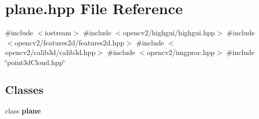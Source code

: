 \section{plane.\+hpp File Reference}
\label{plane_8hpp}
{\ttfamily \#include $<$iostream$>$}\newline
{\ttfamily \#include $<$opencv2/highgui/highgui.\+hpp$>$}\newline
{\ttfamily \#include $<$opencv2/features2d/features2d.\+hpp$>$}\newline
{\ttfamily \#include $<$opencv2/calib3d/calib3d.\+hpp$>$}\newline
{\ttfamily \#include $<$opencv2/imgproc.\+hpp$>$}\newline
{\ttfamily \#include \char`\"{}point3d\+Cloud.\+hpp\char`\"{}}\newline
\subsection*{Classes}
\begin{DoxyCompactItemize}
\item 
class \textbf{ plane}
\end{DoxyCompactItemize}
